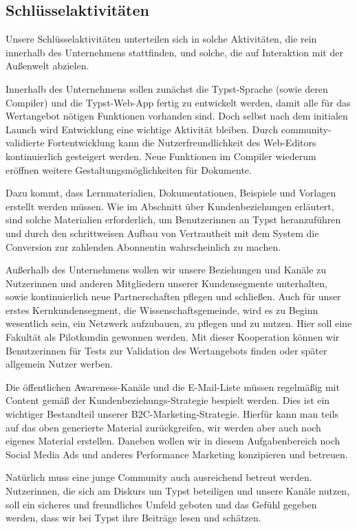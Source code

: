 \documentclass[11pt, a4paper]{article}
\newcommand{\gender}{\raisebox{-.25em}{*}}
\renewcommand{\glossary} {\marginsymbol{\textbf{↪}}}
\newcommand{\marginsymbol}[1] {\protect\marginsymbolhelper{#1}}
\newcommand{\marginsymbolhelper}[1] {\tabto*{-1cm}\makebox[0cm]{#1}\tabto*{\TabPrevPos}}
\begin{document}
\subsection*{Schlüsselaktivitäten}

Unsere Schlüsselaktivitäten unterteilen sich in solche Aktivitäten, die rein innerhalb des Unternehmens stattfinden, und solche, die auf Interaktion mit der Außenwelt abzielen.


Innerhalb des Unternehmens sollen zunächst die \glossary Typst-Sprache (sowie deren Compiler) und die Typst-Web-App fertig zu entwickelt werden, damit alle für das Wertangebot nötigen Funktionen vorhanden sind. Doch selbst nach dem initialen Launch wird Entwicklung eine wichtige Aktivität bleiben. Durch community-validierte Fortentwicklung kann die Nutzerfreundlichkeit des Web-Editors kontinuierlich gesteigert werden. Neue Funktionen im Compiler wiederum eröffnen weitere Gestaltungsmöglichkeiten für Dokumente.

Dazu kommt, dass Lernmaterialien, Dokumentationen, Beispiele und Vorlagen erstellt werden müssen. Wie im Abschnitt über Kundenbeziehungen erläutert, sind solche Materialien erforderlich, um Benutzer\gender{}innen an Typst heranzuführen und durch den schrittweisen Aufbau von Vertrautheit mit dem System die Conversion zur\gender{} zahlenden Abonnent\gender{}in wahrscheinlich zu machen.

Außerhalb des Unternehmens wollen wir unsere Beziehungen und Kanäle zu Nutzer\gender{}innen und anderen Mitgliedern unserer Kundensegmente unterhalten, sowie kontinuierlich neue Partnerschaften pflegen und schließen. Auch für unser erstes Kernkundensegment, die Wissenschaftsgemeinde, wird es zu Beginn wesentlich sein, ein Netzwerk aufzubauen, zu pflegen und zu nutzen. Hier soll eine Fakultät als Pilotkundin gewonnen werden. Mit dieser Kooperation können wir Benutzer\gender{}innen für Tests zur Validation des Wertangebots finden oder später allgemein Nutzer werben.

Die öffentlichen Awareness-Kanäle und die E-Mail-Liste müssen regelmäßig mit Content gemäß der Kundenbeziehungs-Strategie bespielt werden. Dies ist ein wichtiger Bestandteil unserer B2C-Marketing-Strategie. Hierfür kann man teils auf das oben generierte Material zurückgreifen, wir werden aber auch noch eigenes Material erstellen. Daneben wollen wir in diesem Aufgabenbereich noch Social Media Ads und anderes Performance Marketing konzipieren und betreuen.

Natürlich muss eine junge Community auch ausreichend betreut werden. Nutzer\gender{}innen, die sich am Diskurs um Typst beteiligen und unsere Kanäle nutzen, soll ein sicheres und freundliches Umfeld geboten und das Gefühl gegeben werden, dass wir bei Typst ihre Beiträge lesen und schätzen.
\end{document}
